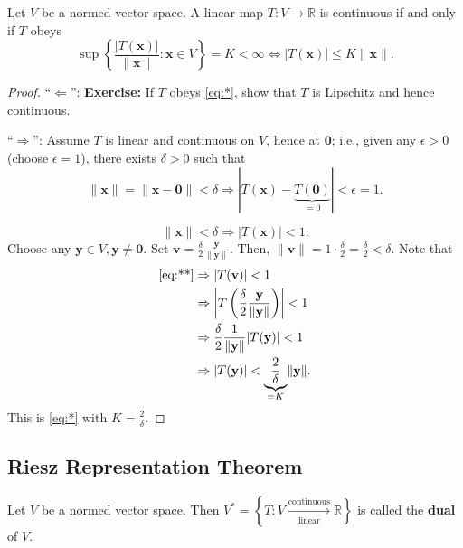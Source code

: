 \documentclass[letterpaper, reqno,11pt]{article}
\newcommand{\RR}{\mathbb{R}}
\begin{document}
\begin{thm}
  \normalfont Let $V$ be a normed vector space. A linear map $T : V \to \RR$ is continuous if and only if $T$ obeys
  \begin{equation} \label{eq:*} \tag{*}
    \sup \left\{ \frac{|T(\mathbf x)|}{\lVert \mathbf x \rVert} : \mathbf x \in V \right\} = K < \infty \Leftrightarrow |T(\mathbf x)| \leq K \lVert \mathbf x \rVert.
  \end{equation}
\end{thm}

\begin{proof}
  ``$\Leftarrow$'': {\bf Exercise:} If $T$ obeys \eqref{eq:*}, show that $T$ is Lipschitz and hence continuous.

  ``$\Rightarrow$'': Assume $T$ is linear and continuous on $V$, hence at $\mathbf 0$; i.e., given any $\epsilon > 0$ (choose $\epsilon = 1$), there exists $\delta > 0$ such that
  $$ \lVert \mathbf x \rVert = \lVert \mathbf x - \mathbf 0 \rVert < \delta \Rightarrow \left|T(\mathbf x) - \underbrace{T(\mathbf 0)}_{= 0}\right| < \epsilon = 1. $$

  \begin{equation} \label{eq:**} \tag{**}
    \lVert \mathbf x \rVert < \delta \Rightarrow |T(\mathbf x)| < 1.
  \end{equation}
  Choose any $\mathbf y \in V, \mathbf y \neq \mathbf 0$. Set $\mathbf v = \frac{\delta}{2} \frac{\mathbf y}{\lVert \mathbf y \rVert}$. Then, $\lVert \mathbf v \rVert = 1 \cdot \frac{\delta}{2} = \frac{\delta}{2} < \delta$. Note that
  \begin{align*}
    \eqref{eq:**} &\Rightarrow |T(\mathbf v)| < 1 \\
    &\Rightarrow \left|T\left(\frac{\delta}{2} \frac{\mathbf y}{\lVert \mathbf y \rVert}\right)\right| < 1 \\
    &\Rightarrow \frac{\delta}{2} \frac{1}{\lVert \mathbf y \rVert} |T(\mathbf y)| < 1 \\
    &\Rightarrow |T(\mathbf y)| < \underbrace{\frac{2}{\delta}}_{= K} \lVert \mathbf y \rVert.
  \end{align*}
  This is \eqref{eq:*} with $K = \frac{2}{\delta}$.
\end{proof}

\subsection{Riesz Representation Theorem}

\begin{defn}
  \normalfont Let $V$ be a normed vector space. Then $V^* = \left\{ T : V \xrightarrow[\text{linear}]{\text{continuous}} \RR \right\}$ is called the {\bf dual} of $V$.
\end{defn}
\end{document}
